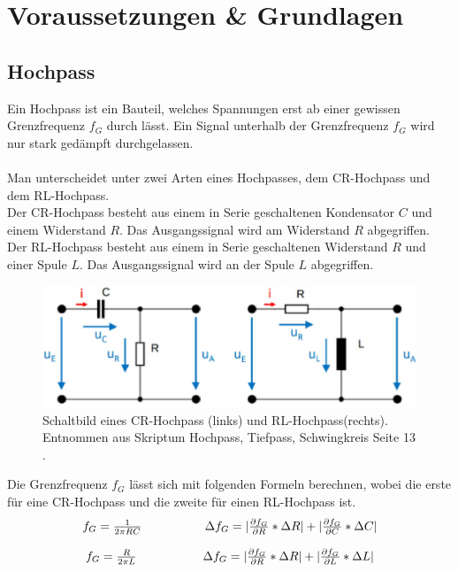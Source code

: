 \documentclass[12pt,a4paper,twoside]{article}
\begin{document}
\section{Voraussetzungen \& Grundlagen} %
\subsection{Hochpass}
Ein Hochpass ist ein Bauteil, welches Spannungen erst ab einer gewissen Grenzfrequenz $f_G$ durch lässt. 
Ein Signal unterhalb der Grenzfrequenz $f_G$ wird nur stark gedämpft durchgelassen. 
\\
\\
Man unterscheidet unter zwei Arten eines Hochpasses, dem CR-Hochpass und dem RL-Hochpass. \\
Der CR-Hochpass besteht aus einem in Serie geschaltenen Kondensator $C$ und einem Widerstand $R$. 
Das Ausgangssignal wird am Widerstand $R$ abgegriffen. 
\\
Der RL-Hochpass besteht aus einem in Serie geschaltenen Widerstand $R$ und einer Spule $L$. Das Ausgangssignal wird an der Spule $L$ abgegriffen. 

\begin{figure}[H]
    \centering
    \includegraphics[width=0.6\linewidth]{nudes/HP.jpg}
    \caption{Schaltbild eines CR-Hochpass (links) und RL-Hochpass(rechts). Entnommen aus Skriptum Hochpass, Tiefpass, Schwingkreis Seite 13 \cite{teachcenter2}. }
    \label{fig:grundHochpass}
\end{figure}

\noindent
Die Grenzfrequenz $f_G$ lässt sich mit folgenden Formeln berechnen, wobei die erste für eine CR-Hochpass und die zweite für einen RL-Hochpass ist. 
\begin{equation}
    \label{eq:Grenzfrequenz CR-HP}
    \centerline{$f_G = \frac{1}{2 \pi RC}$ \\ $\Delta f_G = \vert \frac{\partial f_G}{\partial R} * \Delta R \vert + \vert \frac{\partial f_G}{\partial C} * \Delta C \vert$}
\end{equation}

\begin{equation}
    \label{eq:Grenzfrequenz RL-HP}
    \centerline{$f_G = \frac{R}{2 \pi L}$ \\ $\Delta f_G = \vert \frac{\partial f_G}{\partial R} * \Delta R \vert + \vert \frac{\partial f_G}{\partial L} * \Delta L \vert$}
\end{equation}
\end{document}
